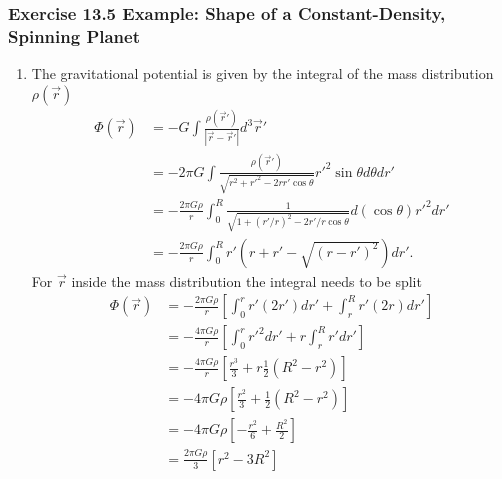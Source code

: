 \documentclass[10pt,a4paper]{book}
\theoremstyle{definition}
\begin{document}
\subsubsection{Exercise 13.5 Example: Shape of a Constant-Density, Spinning Planet}
\begin{enumerate}[label=(\alph*)]
\item The gravitational potential is given by the integral of the mass distribution $\rho(\vec{r})$
\begin{align}
    \Phi(\vec{r})
    &=-G\int\frac{\rho(\vec{r}')}{|\vec{r}-\vec{r}'|}d^3\vec{r}'\\
    &=-2\pi G\int\frac{\rho(\vec{r}')}{\sqrt{r^2+{r'}^2-2rr'\cos\theta}}r'^2\sin\theta d\theta dr'\\
    &=-\frac{2\pi G\rho}{r}\int_0^R\frac{1}{\sqrt{1+(r'/r)^2-2r'/r\cos\theta}}d(\cos\theta) r'^2dr'\\
    &=-\frac{2\pi G\rho}{r}\int_0^Rr'\left(r+r'-\sqrt{(r-r')^2}\right)dr'.
\end{align}
For $\vec{r}$ inside the mass distribution the integral needs to be split
\begin{align}
    \Phi(\vec{r})
    &=-\frac{2\pi G\rho}{r}\left[\int_0^rr'\left(2r'\right)dr'+\int_r^Rr'\left(2r\right)dr'\right]\\
    &=-\frac{4\pi G\rho}{r}\left[\int_0^rr'^2dr'+r\int_r^Rr'dr'\right]\\
    &=-\frac{4\pi G\rho}{r}\left[\frac{r^3}{3}+r\frac{1}{2}(R^2-r^2)\right]\\
    &=-4\pi G\rho\left[\frac{r^2}{3}+\frac{1}{2}(R^2-r^2)\right]\\
    &=-4\pi G\rho\left[-\frac{r^2}{6}+\frac{R^2}{2}\right]\\
    &=\frac{2\pi G\rho}{3}\left[r^2-3R^2\right]
\end{align}


\end{enumerate}
\end{document}
